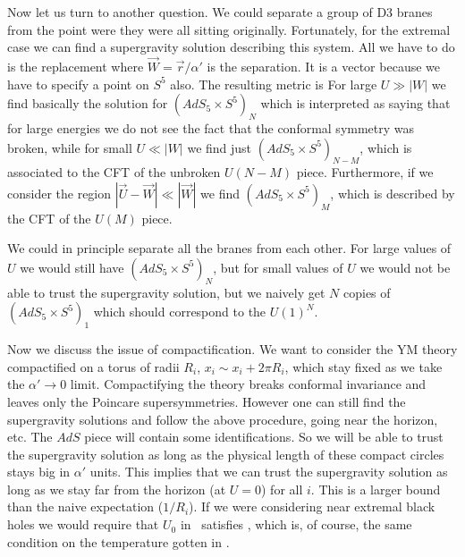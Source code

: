 Now let us turn to another question. We could separate a group of D3 branes
from the point were they were all sitting originally. 
Fortunately, for the extremal case we can find a supergravity 
 solution describing this
system. All we have to do is the  replacement   
\eqn{}
where $\vec W =  \vec r/\alpha'$ is the separation. It is a vector because
we have to specify a point on $S^5$ also. 
The resulting metric is 
\eqn{}
For large $U\gg |W|$ we find basically 
the solution for $(AdS_5 \times S^5)_N$ which is interpreted as saying 
that 
for large energies we do not see the fact that the conformal symmetry was
broken, while for 
small $U\ll |W| $ we find just $(AdS_5 \times S^5)_{N-M}$, which is 
associated to the CFT of the unbroken $U(N-M)$ piece. 
Furthermore, 
if we consider the region 
 $ | \vec U - \vec W | \ll |\vec W| $ we find
 $(AdS_5 \times S^5)_M$, which is described by 
the CFT of the $U(M)$ piece.


We could in principle separate all the branes from each other. For large 
values of $U$ we would still have $(AdS_5 \times S^5)_N$, but for small
values of $U$ we would not be able to trust the supergravity solution,
but we naively get $N$ copies of  $(AdS_5 \times S^5)_1$ which should
correspond to the $U(1)^N$. 

Now we discuss the issue of compactification. 
We want to consider the YM theory compactified on a torus of radii
$R_i$, $ x_i \sim x_i + 2 \pi R_i$, 
which stay fixed as we take the $\alpha' \to 0$ limit. 
Compactifying the theory breaks conformal invariance and leaves only the
Poincare supersymmetries.
However one can still find the supergravity solutions and follow the 
above procedure, going near the horizon, etc. 
The $AdS$ piece will contain some identifications. 
So we will be able to trust the supergravity solution as long as the
physical length of these compact circles stays big in $\alpha'$ units. 
This implies that we can trust the supergravity solution
as long as we stay far from the horizon (at $U=0$) 
\eqn{}
for all $i$. 
This is a larger bound than the naive expectation 
($1/R_i$).
If we were considering near extremal black holes we would require that
$U_0$  in \ne\ satisfies \bigu , which is, of course, the same condition 
on the temperature gotten in \bfks .

